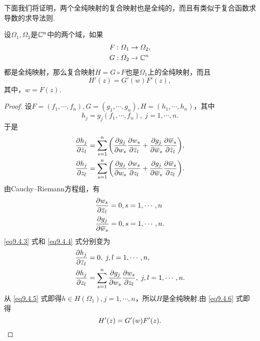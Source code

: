 下面我们将证明，两个全纯映射的复合映射也是全纯的，而且有类似于复合函数求导数的求导法则.
\begin{prop}\label{prop9.4.4}
设$\Omega_1,\Omega_2$是$\MC^n$中的两个域，如果
\begin{align*}
&F:\Omega_1\to\Omega_2,\\
&G:\Omega_2\to\MC^n
\end{align*}
都是全纯映射，那么复合映射$H=G\circ F$也是$\Omega_1$上的全纯映射，而且
\[H'(z)=G'(w)F'(z),\]
其中，$w=F(z)$.
\end{prop}
\begin{proof}
设$F=(f_1,\cdots,f_n),G=(g_1,\cdots,g_n),H=(h_1,\cdots,h_n)$，其中
\[h_j=g_j(f_1,\cdots,f_n),\;j=1,\cdots,n.\]
于是
\begin{align}
&\pp{h_j}{\bar{z}_l}=\sum_{s=1}^n\bigg(\pp{g_j}{w_s}\pp{w_s}{\bar{z}_l}
+\pp{g_j}{\bar{w}_s}\pp{\bar{w}_s}{\bar{z}_l}\bigg),\label{eq9.4.3}\\
&\pp{h_j}{z_l}=\sum_{s=1}^n\bigg(\pp{g_j}{w_s}\pp{w_s}{z_l}
+\pp{g_j}{\bar{w}_s}\pp{\bar{w}_s}{z_l}\bigg).\label{eq9.4.4}
\end{align}
由Cauchy--Riemann方程组，有
\begin{align*}
&\pp{w_s}{\bar{z}_l}=0,s=1,\cdots,n\\
&\pp{g_j}{\bar{w}_s}=0,s=1,\cdots,n.
\end{align*}
\eqref{eq9.4.3} 式和 \eqref{eq9.4.4} 式分别变为
\begin{align}
&\pp{h_j}{\bar{z}_l}=0,\;j,l=1,\cdots,n,\label{eq9.4.5}\\
&\pp{h_j}{z_l}=\sum_{s=1}^n\pp{g_j}{w_s}\pp{w_s}{z_l},\;j,l=1,\cdots,n.\label{eq9.4.6}
\end{align}
从 \eqref{eq9.4.5} 式即得$h\in H(\Omega_1),j=1,\cdots,n$，所以$H$是全纯映射.由 \eqref{eq9.4.6} 式即得
\begin{equation*}
  H'(z) = G'(w)F'(z). \qedhere
\end{equation*}
\end{proof}

